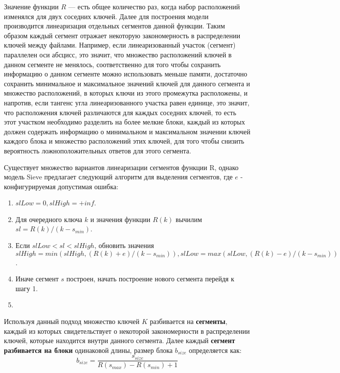 Значение функции $R$ --- есть общее количество раз, когда набор расположений изменялся для двух соседних ключей.
Далее для построения модели производится линеаризация отдельных сегментов данной функции.
Таким образом каждый сегмент отражает некоторую закономерность в распределении ключей между файлами.
Например, если линеаризованный участок (сегмент) параллелен оси абсцисс, это значит, что множество расположений ключей в данном сегменте не менялось, соответственно для того чтобы сохранить информацию о данном сегменте можно использовать меньше памяти, достаточно сохранить минимальное и максимальное значений ключей для данного сегмента и множество расположений, в которых ключи из этого промежутка расположены, и напротив, если тангенс угла линеаризованного участка равен единице, это значит, что расположения ключей различаются для каждых соседних ключей, то есть этот участком необходимо разделить на более мелкие блоки, каждый из которых должен содержать информацию о минимальном и максимальном значении ключей каждого блока и множество расположений этих ключей, для того чтобы снизить вероятность ложноположительных ответов для этого сегмента.

Существует множество вариантов линеаризации  сегментов функции R, однако модель Sieve предлагает следующий алгоритм для выделения сегментов, где $e$ - конфигурируемая допустимая ошибка:
\begin{enumerate}
\item $slLow = 0, slHigh = +inf$.
\item Для очередного ключа $k$ и значения функции $R(k)$ вычилим $sl = R(k) / (k - s_{min})$.
    \item Если $slLow < sl < slHigh$, обновить значения $slHigh = min(slHigh, (R(k) + e) / (k - s_{min})),
slLow = max(slLow, (R(k) - e) / (k - s_{min}))$.
    \item Иначе сегмент $s$ построен, начать построение нового сегмента перейдя к шагу 1.
\item
\end{enumerate}

Используя данный подход множество ключей $K$ разбивается на \textbf{сегменты}, каждый из которых свидетельствует о некоторой закономерности в распределении ключей, которые находится внутри данного сегмента. Далее каждый \textbf{сегмент разбивается на блоки} одинаковой длины, размер блока $b_{size}$ определяется как:
\begin{equation}\label{partition_size}
    b_{size} = \frac{s_{size}}{R(s_{max}) - R(s_{min}) + 1}
\end{equation}

